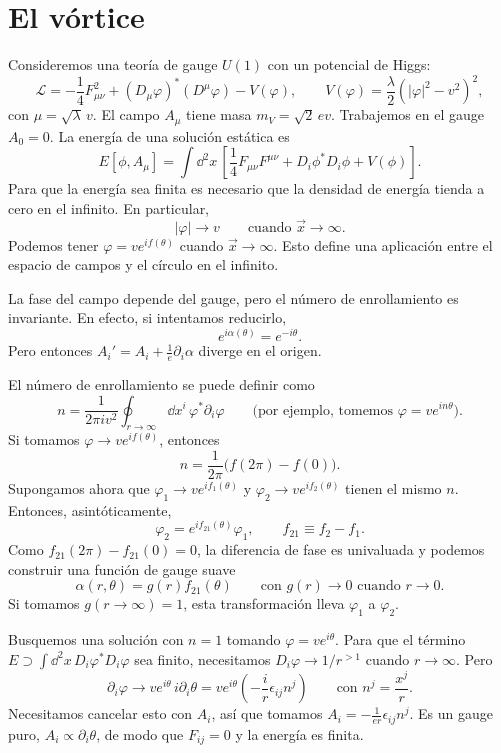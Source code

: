 \documentclass[11pt,a4paper]{article}
\begin{document}
\section*{El vórtice}

Consideremos una teoría de gauge $U(1)$ con un potencial de Higgs:
\[
\mathcal L=-\frac14F_{\mu\nu}^2+(D_\mu\varphi)^*(D^\mu\varphi)-V(\varphi),
\qquad V(\varphi)=\frac{\lambda}{2}(|\varphi|^2-v^2)^2,
\]
con $\mu=\sqrt{\lambda}\,v$. El campo $A_\mu$ tiene masa $m_V=\sqrt{2}\,ev$.
Trabajemos en el gauge $A_0=0$. La energía de una solución estática es
\[
E[\phi,A_\mu]=\int\dd^2 x\,
  \left[\frac14 F_{\mu\nu}F^{\mu\nu}+D_i\phi^* D_i\phi+V(\phi)\right].
\]
Para que la energía sea finita es necesario que la densidad de energía
tienda a cero en el infinito. En particular,
\[
|\varphi|\to v\qquad\text{cuando }\vec{x}\to\infty.
\]
Podemos tener $\varphi=v e^{if(\theta)}$ cuando $\vec{x}\to\infty$.
Esto define una aplicación entre el espacio de campos y el círculo en el
infinito.

La fase del campo depende del gauge, pero el número de enrollamiento es
invariante. En efecto, si intentamos reducirlo,
\[
e^{i\alpha(\theta)}=e^{-i\theta}.
\]
Pero entonces $A_i'=A_i+\frac{1}{e}\partial_i\alpha$ diverge en el origen.

El número de enrollamiento se puede definir como
\[
n=\frac{1}{2\pi i v^2}\oint_{r\to\infty}\dd x^i\,\varphi^*\partial_i\varphi
\qquad\text{(por ejemplo, tomemos }\varphi=v e^{in\theta}\text{)}.
\]
Si tomamos $\varphi\to v e^{if(\theta)}$, entonces
\[
n=\frac{1}{2\pi}\bigl(f(2\pi)-f(0)\bigr).
\]
Supongamos ahora que $\varphi_1\to v e^{if_1(\theta)}$ y
$\varphi_2\to v e^{if_2(\theta)}$ tienen el mismo $n$. Entonces,
asintóticamente,
\[
\varphi_2=e^{if_{21}(\theta)}\varphi_1,\qquad f_{21}\equiv f_2-f_1.
\]
Como $f_{21}(2\pi)-f_{21}(0)=0$, la diferencia de fase es univaluada y
podemos construir una función de gauge suave
\[
\alpha(r,\theta)=g(r)f_{21}(\theta)
\qquad\text{con }g(r)\to0\text{ cuando }r\to0.
\]
Si tomamos $g(r\to\infty)=1$, esta transformación lleva $\varphi_1$ a
$\varphi_2$.

Busquemos una solución con $n=1$ tomando $\varphi=v e^{i\theta}$.
Para que el término $E\supset\int\dd^2 x\,D_i\varphi^* D_i\varphi$ sea
finito, necesitamos $D_i\varphi\to1/r^{>1}$ cuando $r\to\infty$. Pero
\[
\partial_i\varphi\to v e^{i\theta}\,i\partial_i\theta
  =v e^{i\theta}\left(-\frac{i}{r}\epsilon_{ij}n^j\right)
\qquad\text{con }n^j=\frac{x^j}{r}.
\]
Necesitamos cancelar esto con $A_i$, así que tomamos
$A_i=-\frac{1}{er}\epsilon_{ij}n^j$. Es un gauge puro,
$A_i\propto\partial_i\theta$, de modo que $F_{ij}=0$ y la energía es finita.
\end{document}
